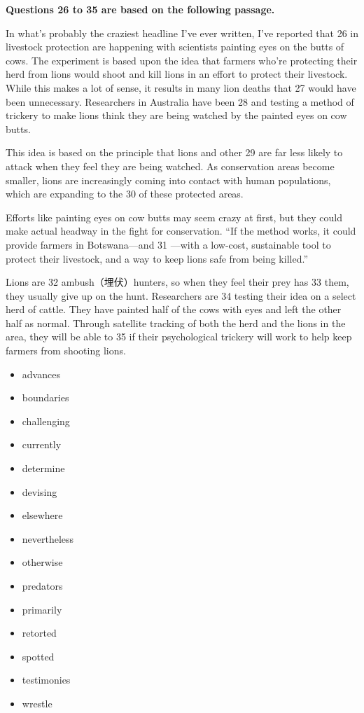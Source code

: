 \documentclass[UTF8,11pt]{ctexart}
\begin{document}
\textbf{Questions 26 to 35 are based on the following passage.}


In what’s probably the craziest headline I’ve ever written, I’ve reported that 26 in livestock protection are happening with scientists painting eyes on the butts of cows. The experiment is based upon the idea that farmers who’re protecting their herd from lions would shoot and kill lions in an effort to protect their livestock. While this makes a lot of sense, it results in many lion deaths that 27 would have been unnecessary. Researchers in Australia have been 28 and testing a method of trickery to make lions think they are being watched by the painted eyes on cow butts.


This idea is based on the principle that lions and other 29 are far less likely to attack when they feel they are being watched. As conservation areas become smaller, lions are increasingly coming into contact with human populations, which are expanding to the 30 of these protected areas.


Efforts like painting eyes on cow butts may seem crazy at first, but they could make actual headway in the fight for conservation. “If the method works, it could provide farmers in Botswana—and 31 —with a low-cost, sustainable tool to protect their livestock, and a way to keep lions safe from being killed.”


Lions are 32 ambush（埋伏）hunters, so when they feel their prey has 33 them, they usually give up on the hunt. Researchers are 34 testing their idea on a select herd of cattle. They have painted half of the cows with eyes and left the other half as normal. Through satellite tracking of both the herd and the lions in the area, they will be able to 35 if their psychological trickery will work to help keep farmers from shooting lions.


\begin{itemize}[leftmargin=2em,itemsep=.2em,topsep=.4em]\item[A.] advances
\item[B.] boundaries
\item[C.] challenging
\item[D.] currently
\item[E.] determine
\item[F.] devising
\item[G.] elsewhere
\item[H.] nevertheless
\item[I.] otherwise
\item[J.] predators
\item[K.] primarily
\item[L.] retorted
\item[M.] spotted
\item[N.] testimonies
\item[O.] wrestle
\end{itemize}
\end{document}
